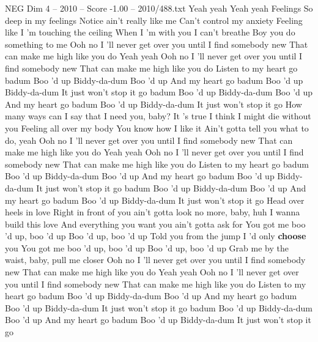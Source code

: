\begin{textsample}{NEG Dim 4 – 2010 – Score -1.00 – 2010/488.txt}  \label{ex:f4_neg_014}
Yeah yeah Yeah yeah Feelings So deep in my feelings Notice ain't really like me Can't control my anxiety Feeling like I 'm touching the ceiling When I 'm with you I can't breathe Boy you do something to me Ooh no I 'll never get over you until I find somebody new That can make me high like you do Yeah yeah Ooh no I 'll never get over you until I find somebody new That can make me high like you do Listen to my heart go badum Boo 'd up Biddy-da-dum Boo 'd up And my heart go badum Boo 'd up Biddy-da-dum It just won't stop it go badum Boo 'd up Biddy-da-dum Boo 'd up And my heart go badum Boo 'd up Biddy-da-dum It just won't stop it go How many ways can I say that I need you, baby?
It 's true I think I might die without you Feeling all over my body You know how I like it Ain't gotta tell you what to do, yeah Ooh no I 'll never get over you until I find somebody new That can make me high like you do Yeah yeah Ooh no I 'll never get over you until I find somebody new That can make me high like you do Listen to my heart go badum Boo 'd up Biddy-da-dum Boo 'd up And my heart go badum Boo 'd up Biddy-da-dum It just won't stop it go badum Boo 'd up Biddy-da-dum Boo 'd up And my heart go badum Boo 'd up Biddy-da-dum It just won't stop it go Head over heels in love Right in front of you ain't gotta look no more, baby, huh I wanna build this love And everything you want you ain't gotta ask for You got me boo 'd up, boo 'd up Boo 'd up, boo 'd up Told you from the jump I 'd only \textbf{choose} you You got me boo 'd up, boo 'd up Boo 'd up, boo 'd up Grab me by the waist, baby, pull me closer Ooh no I 'll never get over you until I find somebody new That can make me high like you do Yeah yeah Ooh no I 'll never get over you until I find somebody new That can make me high like you do Listen to my heart go badum Boo 'd up Biddy-da-dum Boo 'd up And my heart go badum Boo 'd up Biddy-da-dum It just won't stop it go badum Boo 'd up Biddy-da-dum Boo 'd up And my heart go badum Boo 'd up Biddy-da-dum It just won't stop it go

\end{textsample}
